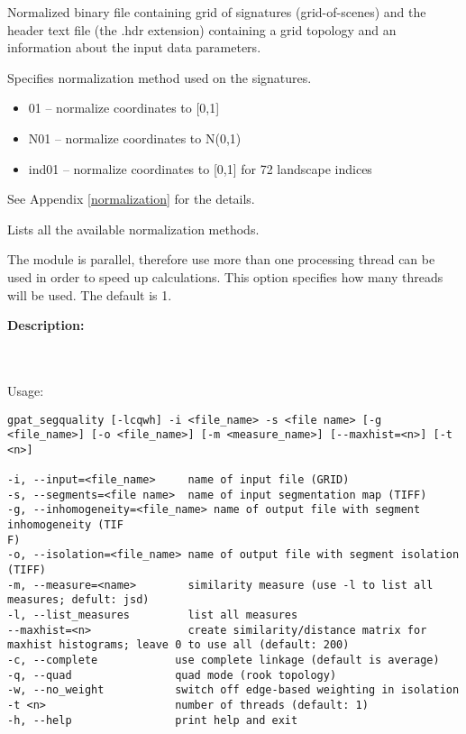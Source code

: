 
Normalized binary file containing grid of signatures (grid-of-scenes) and the header text file (the .hdr extension) containing a grid topology and an information about the input data parameters.


Specifies normalization method used on the signatures. 

\begin{itemize}
	\item 01 -- normalize coordinates to [0,1]
	\item N01 -- normalize coordinates to N(0,1)
	\item ind01 -- normalize coordinates to [0,1] for 72 landscape indices
\end{itemize}

See Appendix \ref{normalization} for the details.


Lists all the available normalization methods.


The module is parallel, therefore use more than one processing thread can be used in order to speed up calculations. 
This option specifies how many threads will be used. 
The default is 1.

{\bf Description:}

{}
\\\\
Usage:

\begin{minipage}{\linewidth}
\begin{lstlisting}
gpat_segquality [-lcqwh] -i <file_name> -s <file name> [-g <file_name>] [-o <file_name>] [-m <measure_name>] [--maxhist=<n>] [-t <n>]

-i, --input=<file_name>     name of input file (GRID)
-s, --segments=<file name>  name of input segmentation map (TIFF)
-g, --inhomogeneity=<file_name> name of output file with segment inhomogeneity (TIF
F)
-o, --isolation=<file_name> name of output file with segment isolation (TIFF)
-m, --measure=<name>        similarity measure (use -l to list all measures; defult: jsd)
-l, --list_measures         list all measures
--maxhist=<n>               create similarity/distance matrix for maxhist histograms; leave 0 to use all (default: 200)
-c, --complete            use complete linkage (default is average)
-q, --quad                quad mode (rook topology)
-w, --no_weight           switch off edge-based weighting in isolation
-t <n>                    number of threads (default: 1)
-h, --help                print help and exit
\end{lstlisting}
\end{minipage}

